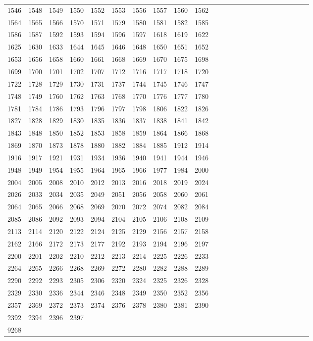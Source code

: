 \begin{longtable}{*{24}{l}}
1546& 1548& 1549& 1550& 1552& 1553& 1556& 1557& 1560& 1562\\
1564& 1565& 1566& 1570& 1571& 1579& 1580& 1581& 1582& 1585\\
1586& 1587& 1592& 1593& 1594& 1596& 1597& 1618& 1619& 1622\\
1625& 1630& 1633& 1644& 1645& 1646& 1648& 1650& 1651& 1652\\
1653& 1656& 1658& 1660& 1661& 1668& 1669& 1670& 1675& 1698\\
1699& 1700& 1701& 1702& 1707& 1712& 1716& 1717& 1718& 1720\\
1722& 1728& 1729& 1730& 1731& 1737& 1744& 1745& 1746& 1747\\
1748& 1749& 1760& 1762& 1763& 1768& 1770& 1776& 1777& 1780\\
1781& 1784& 1786& 1793& 1796& 1797& 1798& 1806& 1822& 1826\\
1827& 1828& 1829& 1830& 1835& 1836& 1837& 1838& 1841& 1842\\
1843& 1848& 1850& 1852& 1853& 1858& 1859& 1864& 1866& 1868\\
1869& 1870& 1873& 1878& 1880& 1882& 1884& 1885& 1912& 1914\\
1916& 1917& 1921& 1931& 1934& 1936& 1940& 1941& 1944& 1946\\
1948& 1949& 1954& 1955& 1964& 1965& 1966& 1977& 1984& 2000\\
2004& 2005& 2008& 2010& 2012& 2013& 2016& 2018& 2019& 2024\\
2026& 2033& 2034& 2035& 2049& 2051& 2056& 2058& 2060& 2061\\
2064& 2065& 2066& 2068& 2069& 2070& 2072& 2074& 2082& 2084\\
2085& 2086& 2092& 2093& 2094& 2104& 2105& 2106& 2108& 2109\\
2113& 2114& 2120& 2122& 2124& 2125& 2129& 2156& 2157& 2158\\
2162& 2166& 2172& 2173& 2177& 2192& 2193& 2194& 2196& 2197\\
2200& 2201& 2202& 2210& 2212& 2213& 2214& 2225& 2226& 2233\\
2264& 2265& 2266& 2268& 2269& 2272& 2280& 2282& 2288& 2289\\
2290& 2292& 2293& 2305& 2306& 2320& 2324& 2325& 2326& 2328\\
2329& 2330& 2336& 2344& 2346& 2348& 2349& 2350& 2352& 2356\\
2357& 2369& 2372& 2373& 2374& 2376& 2378& 2380& 2381& 2390\\
2392& 2394& 2396& 2397& \\
9268&&&&&&&&&\\

\end{longtable}
